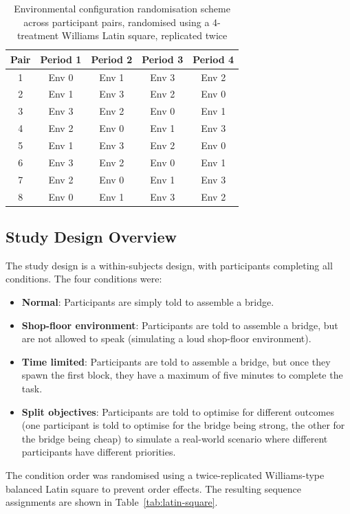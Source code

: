 \begin{table}[htbp]
    \centering
    \begin{tabular}{c|cccc}
        \textbf{Pair} & \textbf{Period 1} & \textbf{Period 2} & \textbf{Period 3} & \textbf{Period 4} \\
        \hline
        1 & Env 0 & Env 1 & Env 3 & Env 2 \\
        2 & Env 1 & Env 3 & Env 2 & Env 0 \\
        3 & Env 3 & Env 2 & Env 0 & Env 1 \\
        4 & Env 2 & Env 0 & Env 1 & Env 3 \\
        5 & Env 1 & Env 3 & Env 2 & Env 0 \\
        6 & Env 3 & Env 2 & Env 0 & Env 1 \\
        7 & Env 2 & Env 0 & Env 1 & Env 3 \\
        8 & Env 0 & Env 1 & Env 3 & Env 2 \\
    \end{tabular}
    \caption{Environmental configuration randomisation scheme across participant pairs, randomised using a 4-treatment Williams Latin square, replicated twice\cite{williams1949experimental}}
    \label{tab:environment-randomisation}
\end{table}

\subsection{Study Design Overview}\label{subsec:study-design-overview}
The study design is a within-subjects design, with participants completing all conditions. The four conditions were:
\begin{itemize}
    \item \textbf{Normal}: Participants are simply told to assemble a bridge.
    \item \textbf{Shop-floor environment}: Participants are told to assemble a bridge, but are not allowed to speak (simulating a loud shop-floor environment).
    \item \textbf{Time limited}: Participants are told to assemble a bridge, but once they spawn the first block, they have a maximum of five minutes to complete the task.
    \item \textbf{Split objectives}: Participants are told to optimise for different outcomes (one participant is told to optimise for the bridge being strong, the other for the bridge being cheap) to simulate a real-world scenario where different participants have different priorities.
\end{itemize}
The condition order was randomised using a twice-replicated Williams-type balanced Latin square to prevent order effects\cite{williams1949experimental}. The resulting sequence assignments are shown in Table~\ref{tab:latin-square}.

